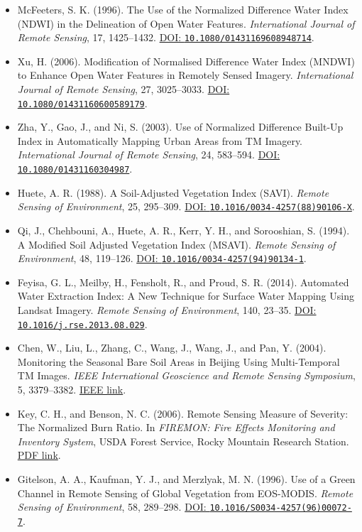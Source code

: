 \documentclass[11pt,a4paper]{article}
\begin{document}
\begin{itemize}
  \item McFeeters, S. K. (1996). The Use of the Normalized Difference Water Index (NDWI) in the Delineation of Open Water Features. \textit{International Journal of Remote Sensing}, 17, 1425--1432. \href{https://doi.org/10.1080/01431169608948714}{DOI: \texttt{10.1080/01431169608948714}}.
  \item Xu, H. (2006). Modification of Normalised Difference Water Index (MNDWI) to Enhance Open Water Features in Remotely Sensed Imagery. \textit{International Journal of Remote Sensing}, 27, 3025--3033. \href{https://doi.org/10.1080/01431160600589179}{DOI: \texttt{10.1080/01431160600589179}}.
  \item Zha, Y., Gao, J., and Ni, S. (2003). Use of Normalized Difference Built-Up Index in Automatically Mapping Urban Areas from TM Imagery. \textit{International Journal of Remote Sensing}, 24, 583--594. \href{https://doi.org/10.1080/01431160304987}{DOI: \texttt{10.1080/01431160304987}}.
  \item Huete, A. R. (1988). A Soil-Adjusted Vegetation Index (SAVI). \textit{Remote Sensing of Environment}, 25, 295--309. \href{https://doi.org/10.1016/0034-4257(88)90106-X}{DOI: \texttt{10.1016/0034-4257(88)90106-X}}.
  \item Qi, J., Chehbouni, A., Huete, A. R., Kerr, Y. H., and Sorooshian, S. (1994). A Modified Soil Adjusted Vegetation Index (MSAVI). \textit{Remote Sensing of Environment}, 48, 119--126. \href{https://doi.org/10.1016/0034-4257(94)90134-1}{DOI: \texttt{10.1016/0034-4257(94)90134-1}}.
  \item Feyisa, G. L., Meilby, H., Fensholt, R., and Proud, S. R. (2014). Automated Water Extraction Index: A New Technique for Surface Water Mapping Using Landsat Imagery. \textit{Remote Sensing of Environment}, 140, 23--35. \href{https://doi.org/10.1016/j.rse.2013.08.029}{DOI: \texttt{10.1016/j.rse.2013.08.029}}.
  \item Chen, W., Liu, L., Zhang, C., Wang, J., Wang, J., and Pan, Y. (2004). Monitoring the Seasonal Bare Soil Areas in Beijing Using Multi-Temporal TM Images. \textit{IEEE International Geoscience and Remote Sensing Symposium}, 5, 3379--3382. \href{https://ieeexplore.ieee.org/document/1370469}{IEEE link}.
  \item Key, C. H., and Benson, N. C. (2006). Remote Sensing Measure of Severity: The Normalized Burn Ratio. In \textit{FIREMON: Fire Effects Monitoring and Inventory System}, USDA Forest Service, Rocky Mountain Research Station. \href{https://www.fs.usda.gov/rm/pubs/rmrs_gtr164/rmrs_gtr164_13_land_assess.pdf}{PDF link}.
  \item Gitelson, A. A., Kaufman, Y. J., and Merzlyak, M. N. (1996). Use of a Green Channel in Remote Sensing of Global Vegetation from EOS-MODIS. \textit{Remote Sensing of Environment}, 58, 289--298. \href{https://doi.org/10.1016/S0034-4257(96)00072-7}{DOI: \texttt{10.1016/S0034-4257(96)00072-7}}.
\end{itemize}
\end{document}
